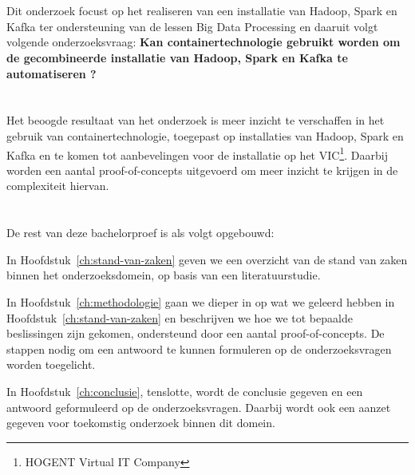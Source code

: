\section{}%
\label{sec:onderzoeksvraag}
Dit onderzoek focust op het realiseren van een installatie van Hadoop, Spark en Kafka ter ondersteuning van de lessen Big Data Processing en daaruit volgt volgende onderzoeksvraag:
\textbf{Kan containertechnologie gebruikt worden om de gecombineerde installatie van Hadoop, Spark en Kafka te automatiseren ?}

\section{}%
\label{sec:onderzoeksdoelstelling}

Het beoogde resultaat van het onderzoek is meer inzicht te verschaffen in het gebruik van containertechnologie, toegepast op  installaties van Hadoop, Spark en Kafka en te komen tot aanbevelingen voor de installatie op het VIC\footnote{HOGENT Virtual IT Company}. Daarbij worden een aantal proof-of-concepts uitgevoerd om meer inzicht te krijgen in de complexiteit hiervan.

\section{}%
\label{sec:opzet-bachelorproef}

De rest van deze bachelorproef is als volgt opgebouwd:

In Hoofdstuk~\ref{ch:stand-van-zaken} geven we een overzicht van de stand van zaken binnen het onderzoeksdomein, op basis van een literatuurstudie.

In Hoofdstuk~\ref{ch:methodologie} gaan we dieper in op wat we geleerd hebben in Hoofdstuk~\ref{ch:stand-van-zaken} en beschrijven we hoe we tot bepaalde beslissingen zijn gekomen, ondersteund door een aantal proof-of-concepts. De stappen nodig om een antwoord te kunnen formuleren op de onderzoeksvragen worden toegelicht.


In Hoofdstuk~\ref{ch:conclusie}, tenslotte, wordt de conclusie gegeven en een antwoord geformuleerd op de onderzoeksvragen. Daarbij wordt ook een aanzet gegeven voor toekomstig onderzoek binnen dit domein.
